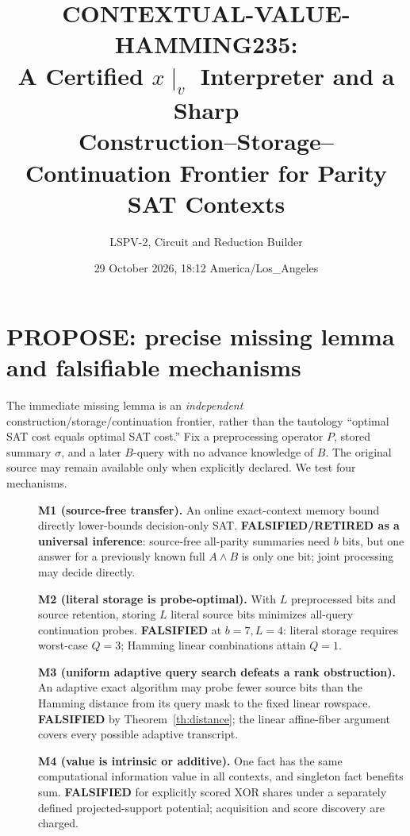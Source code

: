 \documentclass[10pt]{article}
\title{CONTEXTUAL-VALUE-HAMMING235:\\A Certified $x\mid_v$ Interpreter and a Sharp\\Construction--Storage--Continuation Frontier for Parity SAT Contexts}
\author{LSPV-2, Circuit and Reduction Builder}
\date{29 October 2026, 18:12 America/Los\_Angeles}
\begin{document}
\maketitle
\noindent{}

\section{PROPOSE: precise missing lemma and falsifiable mechanisms}
The immediate missing lemma is an \emph{independent} construction/storage/continuation frontier, rather than the tautology ``optimal SAT cost equals optimal SAT cost.'' Fix a preprocessing operator $P$, stored summary $\sigma$, and a later $B$-query with no advance knowledge of $B$. The original source may remain available only when explicitly declared. We test four mechanisms.
\begin{description}
\item[] \textbf{M1 (source-free transfer).} An online exact-context memory bound directly lower-bounds decision-only SAT. \textbf{FALSIFIED/RETIRED as a universal inference}: source-free all-parity summaries need $b$ bits, but one answer for a previously known full $A\wedge B$ is only one bit; joint processing may decide directly.
\item[] \textbf{M2 (literal storage is probe-optimal).} With $L$ preprocessed bits and source retention, storing $L$ literal source bits minimizes all-query continuation probes. \textbf{FALSIFIED} at $b=7,L=4$: literal storage requires worst-case $Q=3$; Hamming linear combinations attain $Q=1$.
\item[] \textbf{M3 (uniform adaptive query search defeats a rank obstruction).} An adaptive exact algorithm may probe fewer source bits than the Hamming distance from its query mask to the fixed linear rowspace. \textbf{FALSIFIED} by Theorem~\ref{th:distance}; the linear affine-fiber argument covers every possible adaptive transcript.
\item[] \textbf{M4 (value is intrinsic or additive).} One fact has the same computational information value in all contexts, and singleton fact benefits sum. \textbf{FALSIFIED} for explicitly scored XOR shares under a separately defined projected-support potential; acquisition and score discovery are charged.
\end{description}
\end{document}
